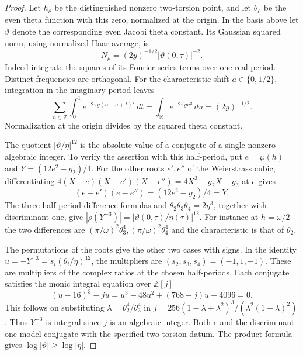 \begin{proof}

Let \(h_\rho\) be the distinguished nonzero two-torsion point,
and let \(\theta_\rho\) be the even theta function with this
zero, normalized at the origin. In the basis above let
\(\vartheta\) denote the corresponding even Jacobi theta
constant. Its Gaussian squared norm, using normalized Haar
average, is
\[
      N_\rho=(2y)^{-1/2}|\vartheta(0,\tau)|^{-2}.
\]
Indeed integrate the squares of its Fourier series terms over
one real period. Distinct frequencies are orthogonal. For the characteristic shift \(a\in\{0,1/2\}\), integration
in the imaginary period leaves
\[
 \sum_{n\in\mathbb Z}\int_0^1e^{-2\pi y(n+a+t)^2}\,dt
    =\int_{\mathbb R}e^{-2\pi y u^2}\,du=(2y)^{-1/2}.
\] Normalization at the
origin divides by the squared theta constant.


The quotient \(|\vartheta/\eta|^{12}\) is the absolute value
of a conjugate of a single nonzero algebraic integer. To verify
the assertion with this half-period, put \(e=\wp(h)\) and
\(Y=(12e^2-g_2)/4\). For the other roots \(e',e''\) of the Weierstrass cubic,
differentiating \(4(X-e)(X-e')(X-e'')=4X^3-g_2X-g_3\) at \(e\)
gives
\[
 (e-e')(e-e'')=(12e^2-g_2)/4=Y .
\] The three half-period difference formulas and
\(\theta_2\theta_3\theta_4=2\eta^3\), together with
discriminant one, give
\(
        |\rho(Y^{-3})|=|\vartheta(0,\tau)/\eta(\tau)|^{12}.
\)
For instance at \(h=\omega/2\) the two differences are
\((\pi/\omega)^2\theta_3^4,(\pi/\omega)^2\theta_4^4\)
and the characteristic is that of \(\theta_2\).

The permutations
of the roots give the other two cases with signs. In the
identity \(u=-Y^{-3}=s_i(\theta_i/\eta)^{12}\), the multipliers
are \((s_2,s_3,s_4)=(-1,1,-1)\). These are multipliers of
the complex ratios at the chosen half-periods. Each conjugate satisfies the monic integral equation over
\(\mathbb Z[j]\)
\[
 (u-16)^3-ju=u^3-48u^2+(768-j)u-4096=0 .
\] This follows on substituting
\(\lambda=\theta_2^4/\theta_3^4\) in
\(j=256(1-\lambda+\lambda^2)^3/(\lambda^2(1-\lambda)^2)\).
Thus \(Y^{-3}\) is integral since \(j\) is an algebraic integer.
Both \(e\) and the discriminant-one model conjugate with the
specified two-torsion datum. The product formula gives
\(\overline{\log|\vartheta|}\ge\overline{\log|\eta|}\).


\end{proof}
